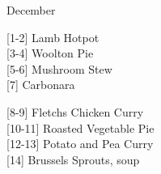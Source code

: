 		\begin{menu}{December}
    
    \begin{recipelist}
    
        {\scriptsize[1-2]} Lamb Hotpot\\
        {\scriptsize[3-4]} Woolton Pie\\
        {\scriptsize[5-6]} Mushroom Stew\\
        {\scriptsize[7]} Carbonara\\%
    \end{recipelist}%
    \begin{recipelist}
    
        {\scriptsize[8-9]} Fletchs Chicken Curry\\
        {\scriptsize[10-11]} Roasted Vegetable Pie\\
        {\scriptsize[12-13]} Potato and Pea Curry\\
        {\scriptsize[14]} Brussels Sprouts, soup\\%
    \end{recipelist}\par%
  

\end{menu}
